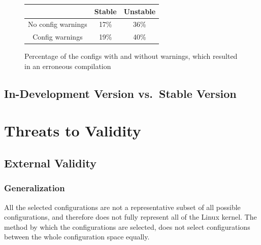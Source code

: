 \documentclass[a4paper,11pt]{report}
\newcommand{\figa}{
    \begin{figure}[!htpb]
    \centering
}
\newcommand{\figb}[2]{
    \caption{#1}
    \label{#2}
    \end{figure}
}
\begin{document}
\figa
    \begin{tabular}{c|c|c}
    \hline
    \hline
        & \textbf{Stable} & \textbf{Unstable} \\
    \hline
    No config warnings & 17\% & 36\%\\
    Config warnings & 19\% & 40\%\\
    \hline
    \hline
    \end{tabular}
\figb{Percentage of the configs with and without warnings, which resulted in an 
    erroneous compilation}{tbl:confwarns}

\fi %



            \section{In-Development Version vs.\ Stable Version}

            \newpage
            \chapter{Threats to Validity}
            \label{ch:ttv}


            \section{External Validity}
            \label{sec:extval}

            \subsection{Generalization}
            \label{sec:consel}

All the selected configurations are not a representative subset of all possible
configurations, and therefore does not fully represent all of the Linux kernel. 
The method by which the configurations are selected, does not select 
configurations between the whole configuration space equally.
\end{document}
